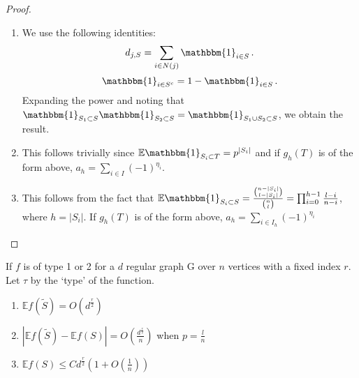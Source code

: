 \documentclass[final,12pt]{colt2018}
\begin{document}
\begin{proof}
\begin{enumerate}
\item
We use the following identities:
$$d_{j,S} = \sum_{i \in N(j)} \mathbbm{1}_{i \in S}\,.$$
$$\mathbbm{1}_{i \in S^c} = 1 - \mathbbm{1}_{i \in S}\,.$$
Expanding the power and noting that $\mathbbm{1}_{S_1 \subset S} \mathbbm{1}_{S_2 \subset S} = \mathbbm{1}_{S_1 \cup S_2 \subset S}$, we obtain the result.
\item
This follows trivially since $\mathbb{E} \mathbbm{1}_{S_i \subset T} = p^{|S_i|}$ and if $g_h(T)$ is of the form above, $a_h = \sum_{i\in I} (-1)^{\eta_i}$.
\item
This follows from the fact that $\mathbb{E}\mathbbm{1}_{S_i \subset S} = \frac{{{n-|S_i|}\choose{l-|S_i|}}}{{{n}\choose{l}}} = \prod_{i=0}^{h-1} \frac{l-i}{n-i}$, where $h = |S_i|$. If $g_h(T)$ is of the form above, $a_h = \sum_{i\in I_h} (-1)^{\eta_i}$
\end{enumerate}

\end{proof}




\begin{lemma}
If $f$ is of type 1 or 2 for a $d$ regular graph G over $n$ vertices with a fixed index $r$. Let $\tau$ by the `type' of the function.
\begin{enumerate}
\item
$\mathbb{E}f(\tilde{S}) = O\left(d^{\frac{r}{2}}\right)$
\item
$|\mathbb{E}f(\tilde{S}) - \mathbb{E}f\left(S\right)| = O\left(\frac{d^{\frac{r}{2}}}{n} \right)$ when $p = \frac{l}{n}$
\item
$\mathbb{E}f(S) \leq Cd^{\frac{r}{2}}\left(1 + O(\frac{1}{n})\right)$
\end{enumerate}
\label{poly_bound}
\end{lemma}
\end{document}
